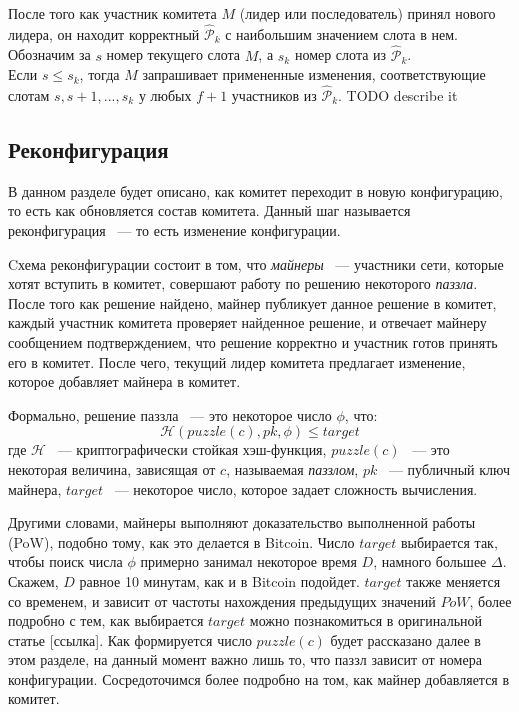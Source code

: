 После того как участник комитета $M$ (лидер или последователь) принял нового лидера, он находит корректный $\hat{\mathcal{P}}_k$ с наибольшим значением слота в нем. Обозначим за $s$ номер текущего слота $M$, а $s_k$ номер слота из $\hat{\mathcal{P}}_k$.\\
Если $s \le s_k$, тогда $M$ запрашивает примененные изменения, соответствующие слотам $s, s+1,..., s_k$ у любых $f+1$ участников из $\hat{\mathcal{P}}_k$.
TODO describe it

\subsection{Реконфигурация}
В данном разделе будет описано, как комитет переходит в новую конфигурацию, то есть как обновляется состав комитета. Данный шаг называется реконфигурация ~--- то есть изменение конфигурации.

Cхема реконфигурации состоит в том, что \textit{майнеры} ~--- участники сети, которые хотят вступить в комитет, совершают работу по решению некоторого \textit{паззла}. После того как решение найдено, майнер публикует данное решение в комитет, каждый участник комитета проверяет найденное решение, и отвечает майнеру сообщением подтверждением, что решение корректно и участник готов принять его в комитет.
После чего, текущий лидер комитета предлагает изменение, которое добавляет майнера в комитет.

Формально, решение паззла ~--- это некоторое число $\phi$, что:
$$\mathcal{H}(puzzle(c), pk, \phi) \le target$$
где $\mathcal{H}$ ~--- криптографически стойкая хэш-функция, $puzzle(c)$ ~--- это некоторая величина, зависящая от $c$, называемая \textit{паззлом}, $pk$ ~--- публичный ключ майнера, $target$ ~--- некоторое число, которое задает сложность вычисления.

Другими словами, майнеры выполняют доказательство выполненной работы (PoW), подобно тому, как это делается в Bitcoin.  Число $target$ выбирается так, чтобы поиск числа $\phi$ примерно занимал некоторое время $D$, намного большее $\Delta$. Скажем, $D$ равное 10 минутам, как и в Bitcoin подойдет.  $target$ также меняется со временем, и зависит от частоты нахождения предыдущих значений $PoW$, более подробно с тем, как выбирается $target$ можно познакомиться в оригинальной статье [ссылка].
Как формируется число $puzzle(c)$ будет рассказано далее в этом разделе, на данный момент важно лишь то, что паззл зависит от номера конфигурации. Сосредоточимся более подробно на том, как майнер добавляется в комитет.


